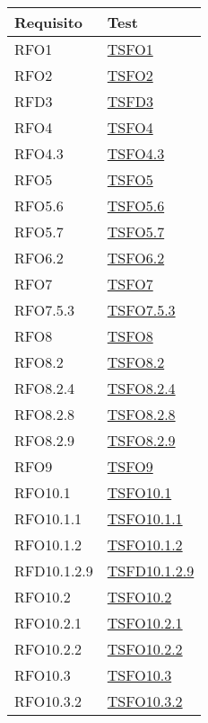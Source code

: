 \normalsize
\begin{longtable}{|>{\centering}m{5cm}|m{5cm}<{\centering}|}
	\hline \rowcolor{Gray}
	\textbf{Requisito} & \textbf{Test}\\
	\hline
	\endhead
	RFO1 & \hyperlink{TSFO1}{TSFO1} \\ \hline
	RFO2 & \hyperlink{TSFO2}{TSFO2} \\ \hline
	RFD3 & \hyperlink{TSFD3}{TSFD3} \\ \hline
	RFO4 & \hyperlink{TSFO4}{TSFO4} \\ \hline
	RFO4.3 & \hyperlink{TSFO4.3}{TSFO4.3} \\ \hline
	RFO5 & \hyperlink{TSFO5}{TSFO5} \\ \hline
	RFO5.6 & \hyperlink{TSFO5.6}{TSFO5.6} \\ \hline
	RFO5.7 & \hyperlink{TSFO5.7}{TSFO5.7} \\ \hline
	RFO6.2 & \hyperlink{TSFO6.2}{TSFO6.2} \\ \hline
	RFO7 & \hyperlink{TSFO7}{TSFO7} \\ \hline
	RFO7.5.3 & \hyperlink{TSFO7.5.3}{TSFO7.5.3} \\ \hline
	RFO8 & \hyperlink{TSFO8}{TSFO8} \\ \hline
	RFO8.2 & \hyperlink{TSFO8.2}{TSFO8.2} \\ \hline
	RFO8.2.4 & \hyperlink{TSFO8.2.4}{TSFO8.2.4} \\ \hline
	RFO8.2.8 & \hyperlink{TSFO8.2.8}{TSFO8.2.8} \\ \hline
	RFO8.2.9 & \hyperlink{TSFO8.2.9}{TSFO8.2.9} \\ \hline
	RFO9 & \hyperlink{TSFO9}{TSFO9} \\ \hline
	RFO10.1 & \hyperlink{TSFO10.1}{TSFO10.1} \\ \hline
	RFO10.1.1 & \hyperlink{TSFO10.1.1}{TSFO10.1.1} \\ \hline
	RFO10.1.2 & \hyperlink{TSFO10.1.2}{TSFO10.1.2} \\ \hline
	RFD10.1.2.9 & \hyperlink{TSFD10.1.2.9}{TSFD10.1.2.9} \\ \hline
	RFO10.2 & \hyperlink{TSFO10.2}{TSFO10.2} \\ \hline
	RFO10.2.1 & \hyperlink{TSFO10.2.1}{TSFO10.2.1} \\ \hline
	RFO10.2.2 & \hyperlink{TSFO10.2.2}{TSFO10.2.2} \\ \hline
	RFO10.3 & \hyperlink{TSFO10.3}{TSFO10.3} \\ \hline
	RFO10.3.2 & \hyperlink{TSFO10.3.2}{TSFO10.3.2} \\ \hline

\end{longtable}
